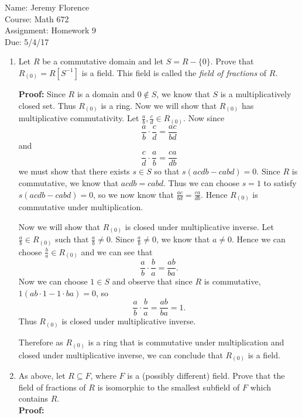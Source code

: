 \documentclass{article}
\newcommand\Proof{%
	\textbf{Proof:} %
}
\begin{document}
Name: Jeremy Florence\\
Course: Math 672\\
Assignment: Homework 9\\
Due: 5/4/17\\

\begin{enumerate}
\item Let $R$ be a commutative domain and let $S=R-\{0\}.$ Prove that $R_{(0)}=R[S^{-1}]$ is a field. This field is called the \emph{field of fractions} of $R$. 

\Proof Since $R$ is a domain and $0 \not \in S$, we know that $S$ is a multiplicatively closed set. Thus $R_{(0)}$ is a ring. Now we will show that $R_{(0)}$ has multiplicative commutativity. Let $\frac{a}{b},\frac{c}{d} \in R_{(0)}$. Now since $$\frac{a}{b} \cdot \frac{c}{d}=\frac{ac}{bd}$$ and $$\frac{c}{d} \cdot \frac{a}{b}=\frac{ca}{db}$$ we must show that there exists $s \in S$ so that $s(acdb-cabd)=0$. Since $R$ is commutative, we know that $acdb=cabd$. Thus we can choose $s=1$ to satisfy $s(acdb-cabd)=0$, so we now know that $\frac{ac}{bd}=\frac{ca}{db}$. Hence $R_{(0)}$ is commutative under multiplication.

Now we will show that $R_{(0)}$ is closed under multiplicative inverse. Let $\frac{a}{b} \in R_{(0)}$ such that $\frac{a}{b} \neq 0$. Since $\frac{a}{b} \neq 0$, we know that $a \neq 0$. Hence we can choose $\frac{b}{a} \in R_{(0)}$ and we can see that $$\frac{a}{b} \cdot \frac{b}{a}=\frac{ab}{ba}.$$ Now we can choose $1 \in S$ and observe that since $R$ is commutative, $1(ab \cdot 1 - 1 \cdot ba)=0$, so $$\frac{a}{b} \cdot \frac{b}{a}=\frac{ab}{ba}=1.$$ Thus $R_{(0)}$ is closed under multiplicative inverse.

Therefore as $R_{(0)}$ is a ring that is commutative under multiplication and closed under multiplicative inverse, we can conclude that $R_{(0)}$ is a field.

\item As above, let $R \subseteq F$, where $F$ is a (possibly different) field. Prove that the field of fractions of $R$ is isomorphic to the smallest subfield of $F$ which contains $R$.\\
\Proof 
\end{enumerate}
\end{document}
